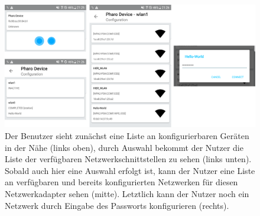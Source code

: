 \documentclass[12pt,a4paper]{article}
\newenvironment{leveldown}%
  {\let\section\subsection%
   \let\subsection\subsubsection%
   \let\subsubsection\paragraph%
   \let\paragraph\subparagraph%
  }{}
\begin{document}
\begin{leveldown}
    \begin{figure}[ht]
		\centering
	    \includegraphics[width=1.0\textwidth]{../latex-ai-project/user_flow.png}
    	\caption{ Der Benutzer sieht zunächst eine Liste an konfigurierbaren Geräten in der Nähe (links oben), durch Auswahl bekommt der Nutzer die Liste der verfügbaren Netzwerkschnittstellen zu sehen (links unten). Sobald auch hier eine Auswahl erfolgt ist, kann der Nutzer eine Liste an verfügbaren und bereits konfigurierten Netzwerken für diesen Netzwerkadapter sehen (mitte). Letztlich kann der Nutzer noch ein Netzwerk durch Eingabe des Passworts konfigurieren (rechts). }
	    \label{user_flow}
	\end{figure}
	
	
	

\end{leveldown}
\end{document}
